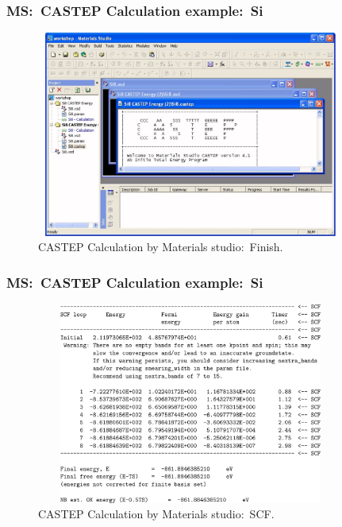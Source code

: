 \frame
{
	\frametitle{\textrm{MS:~CASTEP Calculation example:~Si}}
\begin{figure}[h!]
\centering
\vspace*{-0.10in}
\includegraphics[height=2.66in,width=4.00in,viewport=0 0 1150 801,clip]{Figures/MS-CASTEP-07-Si-Calculat-data.png}
\caption{\tiny \textrm{CASTEP Calculation by Materials studio:~Finish.}}%
\label{MS-CASTEP-Calculation-data}
\end{figure}
}

\frame
{
	\frametitle{\textrm{MS:~CASTEP Calculation example:~Si}}
\begin{figure}[h!]
\centering
\vspace*{-0.10in}
\includegraphics[height=2.60in,width=4.00in,viewport=0 0 1039 790,clip]{Figures/MS-CASTEP-08-Si-Calculat-SCF.png}
\caption{\tiny \textrm{CASTEP Calculation by Materials studio:~SCF.}}%
\label{MS-CASTEP-Calculation-SCF}
\end{figure}
}

